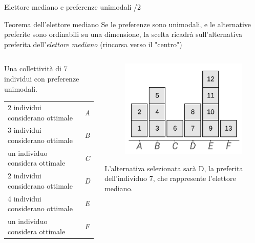 \documentclass[11pt]{beamer}
\begin{document}
\begin{frame}{Elettore mediano e preferenze unimodali /2}
\begin{block}{Teorema dell'elettore mediano}
Se le preferenze sono unimodali, e le alternative preferite sono ordinabili
 su una dimensione, la scelta ricadrà sull'alternativa preferita
 dell'\emph{elettore mediano} (rincorsa verso il "centro")
\end{block}

\begin{columns}
\begin{column}{.5\columnwidth}
Una collettività di 7 individui con preferenze unimodali.
\medskip

\begin{tabular}[c]{ll}
  2 individui considerano ottimale&\emph{A}\\
  3 individui considerano ottimale&\emph{B}\\
  un individuo considera ottimale &\emph{C}\\
  2 individui considerano ottimale &\emph{D}\\
  4 individui considerano ottimale &\emph{E}\\
  un individuo considera ottimale &\emph{F}
\end{tabular}
\end{column}

\begin{column}{.5\columnwidth}
\begin{figure}[htbp]
\centering
\includegraphics[width=.8\textwidth]{./figure/elettore-mediano-distribuzione.pdf}
\end{figure}

L'alternativa selezionata sarà D, la preferita dell'individuo 7, che rappresente l'elettore mediano.
\end{column}
\end{columns}
\end{frame}
\end{document}
